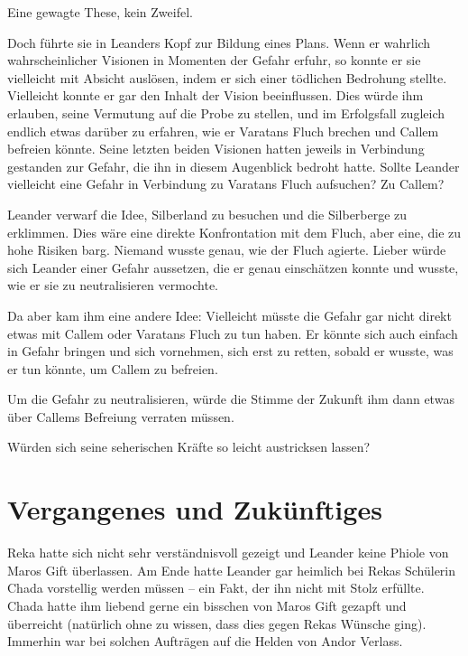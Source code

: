 \documentclass[10pt, a4paper, oneside]{book}
\begin{document}
Eine gewagte These, kein Zweifel.

Doch führte sie in Leanders Kopf zur Bildung eines Plans. Wenn er wahrlich wahrscheinlicher Visionen in Momenten der Gefahr erfuhr, so konnte er sie vielleicht mit Absicht auslösen, indem er sich einer tödlichen Bedrohung stellte. Vielleicht konnte er gar den Inhalt der Vision beeinflussen. Dies würde ihm erlauben, seine Vermutung auf die Probe zu stellen, und im Erfolgsfall zugleich endlich etwas darüber zu erfahren, wie er Varatans Fluch brechen und Callem befreien könnte. Seine letzten beiden Visionen hatten jeweils in Verbindung gestanden zur Gefahr, die ihn in diesem Augenblick bedroht hatte. Sollte Leander vielleicht eine Gefahr in Verbindung zu Varatans Fluch aufsuchen? Zu Callem?

Leander verwarf die Idee, Silberland zu besuchen und die Silberberge zu erklimmen. Dies wäre eine direkte Konfrontation mit dem Fluch, aber eine, die zu hohe Risiken barg. Niemand wusste genau, wie der Fluch agierte. Lieber würde sich Leander einer Gefahr aussetzen, die er genau einschätzen konnte und wusste, wie er sie zu neutralisieren vermochte.

Da aber kam ihm eine andere Idee: Vielleicht müsste die Gefahr gar nicht direkt etwas mit Callem oder Varatans Fluch zu tun haben. Er könnte sich auch einfach in Gefahr bringen und sich vornehmen, sich erst zu retten, sobald er wusste, was er tun könnte, um Callem zu befreien.

Um die Gefahr zu neutralisieren, würde die Stimme der Zukunft ihm dann etwas über Callems Befreiung verraten müssen.

Würden sich seine seherischen Kräfte so leicht austricksen lassen?







\newpage
\section{Vergangenes und Zukünftiges}



Reka hatte sich nicht sehr verständnisvoll gezeigt und Leander keine Phiole von Maros Gift überlassen. Am Ende hatte Leander gar heimlich bei Rekas Schülerin Chada vorstellig werden müssen – ein Fakt, der ihn nicht mit Stolz erfüllte. Chada hatte ihm liebend gerne ein bisschen von Maros Gift gezapft und überreicht (natürlich ohne zu wissen, dass dies gegen Rekas Wünsche ging). Immerhin war bei solchen Aufträgen auf die Helden von Andor Verlass.
\end{document}
